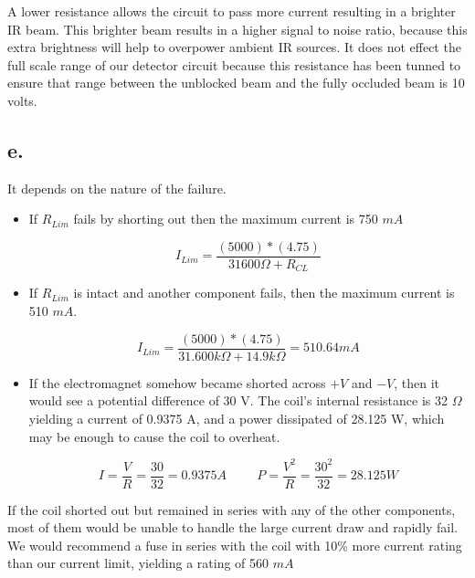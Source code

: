 \documentclass{article}
\theoremstyle{plain}
\theoremstyle{definition}
\theoremstyle{remark}
\begin{document}
A lower resistance allows the circuit to pass more current resulting in a brighter IR beam. This brighter beam results in a higher signal to noise ratio, because this extra brightness will help to overpower ambient IR sources. It does not effect the full scale range of our detector circuit because this resistance has been tunned to ensure that range between the unblocked beam and the fully occluded beam is 10 volts.  \\  

\subsection*{e.}
It depends on the nature of the failure. 

\begin{itemize}
\item If $R_{Lim}$ fails by shorting out then the maximum current is 750 $mA$ 

$$I_{Lim} = \frac{(5000)*(4.75)}{31600\Omega + R_{CL}} $$

\item If $R_{Lim}$ is intact and another component fails, then the maximum current is 510 $mA$. 

$$I_{Lim} = \frac{(5000)*(4.75)}{31.600k\Omega + 14.9k\Omega} =510.64mA$$

\item If the electromagnet somehow became shorted across $+V$ and $-V$, then it would see a potential difference of 30 V.  The coil's internal resistance is 32 $\Omega$ yielding a current of 0.9375 A, and a power dissipated of 28.125 W, which may be enough to cause the coil to overheat.

$$I = \frac{V}{R} = \frac{30}{32} = 0.9375 A \hspace{1cm}  P = \frac{V^{2}}{R} = \frac{30^2}{32} = 28.125 W $$
\end{itemize}

If the coil shorted out but remained in series with any of the other components, most of them would be unable to handle the large current draw and rapidly fail.  We would recommend a fuse in series with the coil with 10\% more current rating than our current limit, yielding a rating of 560 $mA$
\end{document}
